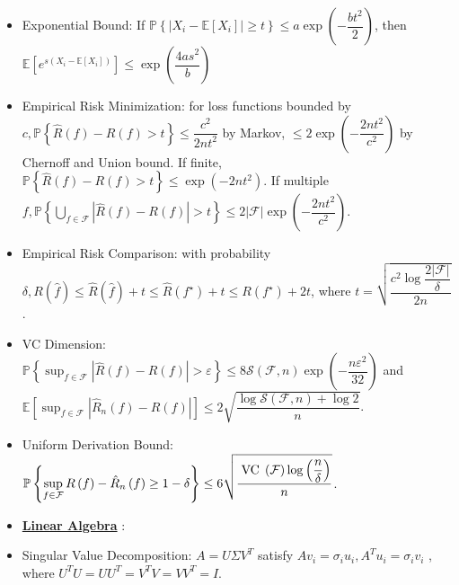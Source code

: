 \documentclass{article}
\begin{document}
\begin{itemize}
\item Exponential Bound: If $\mathbb{P}\left\{| X_{i} - \mathbb{E}\left[X_{i}\right] | \geq  t\right\} \leq  a \exp\left(- \dfrac{b t^{2}}{2}\right)$, then $\mathbb{E}\left[e^{s \left(X_{i} - \mathbb{E}\left[X_{i}\right]\right)}\right] \leq  \exp\left(\dfrac{4 a s^{2}}{b}\right)$
\item Empirical Risk Minimization: for loss functions bounded by $c , \mathbb{P}\left\{\hat{R}\left(f\right) - R\left(f\right) > t\right\} \leq  \dfrac{c^{2}}{2 n t^{2}}$ by Markov, $\leq  2 \exp\left(- \dfrac{2 n t^{2}}{c^{2}}\right)$ by Chernoff and Union bound. If finite, $\mathbb{P}\left\{\hat{R}\left(f\right) - R\left(f\right) > t\right\} \leq  \exp\left(- 2 n t^{2}\right)$. If multiple $f , \mathbb{P}\left\{ \displaystyle\bigcup _{f \in \mathcal{F}} | \hat{R}\left(f\right) - R\left(f\right) | > t\right\} \leq  2 | \mathcal{F} | \exp\left(- \dfrac{2 n t^{2}}{c^{2}}\right)$.
\item Empirical Risk Comparison: with probability $\delta, R\left(\hat{f}\right)  \leq  \hat{R}\left(\hat{f}\right) + t \leq  \hat{R}\left(f^\star \right) + t \leq  R\left(f^\star \right) + 2 t $, where $t  = \sqrt{\dfrac{c^{2} \log \dfrac{2 | \mathcal{F} |}{\delta}}{2 n}}$.
\item VC Dimension: $\mathbb{P}\left\{ \displaystyle\sup_{f \in \mathcal{F}} | \hat{R}\left(f\right) - R\left(f\right) | > \varepsilon \right\} \leq  8 \mathcal{S}\left(\mathcal{F}, n\right) \exp\left(- \dfrac{n \varepsilon^{2}}{32}\right)$ and $\mathbb{E}\left[ \displaystyle\sup_{f \in \mathcal{F}} | \hat{R}_{n} \left(f\right) - R\left(f\right) | \right] \leq  2 \sqrt{\dfrac{\log \mathcal{S}\left(\mathcal{F}, n\right) + \log 2}{n}}$.
\item Uniform Derivation Bound: $\mathbb{P}\left\{\displaystyle\sup_{f \in \mathcal{F}} R\left(f\right) - \hat{R}_{n}\left(f\right) \geq  1 - \delta\right\} \leq  6 \sqrt{\dfrac{\text{\;VC\;} \left(\mathcal{F}\right) \log\left(\dfrac{n}{\delta}\right)}{n}}$.
\item \textbf{\underline{Linear Algebra}} :
\item Singular Value Decomposition: $A  = U \Sigma V^{T}$ satisfy $A  v_{i} = \sigma_{i} u_{i}, A^{T} u_{i} = \sigma_{i} v_{i}$ , where $U^{T} U = U U^{T} = V^{T} V = V V^{T} = I. $

\end{itemize}
\end{document}
